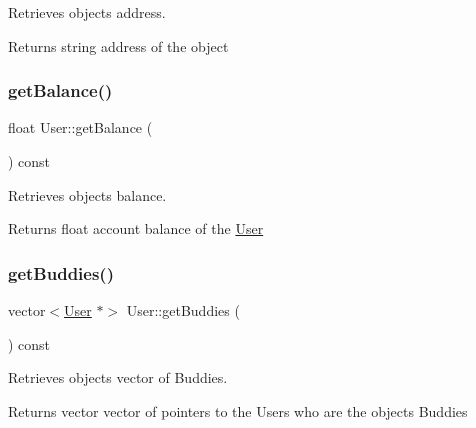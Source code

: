 Retrieves object\textquotesingle{}s address. 

\begin{DoxyReturn}{Returns}
string address of the object 
\end{DoxyReturn}
\mbox{\label{group___user_ga713b20a844b9e70630a50dd5f1357d95}} 
\subsubsection{\texorpdfstring{get\+Balance()}{getBalance()}}
{\footnotesize\ttfamily float User\+::get\+Balance (\begin{DoxyParamCaption}{ }\end{DoxyParamCaption}) const}



Retrieves object\textquotesingle{}s balance. 

\begin{DoxyReturn}{Returns}
float account balance of the \hyperlink{class_user}{User} 
\end{DoxyReturn}
\mbox{\label{group___user_ga47d6c3dccd2b1c3050fbd0f572bac6f8}} 
\subsubsection{\texorpdfstring{get\+Buddies()}{getBuddies()}}
{\footnotesize\ttfamily vector$<$\hyperlink{class_user}{User} $\ast$$>$ User\+::get\+Buddies (\begin{DoxyParamCaption}{ }\end{DoxyParamCaption}) const\hspace{0.3cm}{\ttfamily [inline]}}



Retrieves object\textquotesingle{}s vector of Buddies. 

\begin{DoxyReturn}{Returns}
vector vector of pointers to the Users who are the object\textquotesingle{}s Buddies 
\end{DoxyReturn}
\mbox{\label{group___user_ga986c6f30aeac167bb5d311dd412cf604}} 
